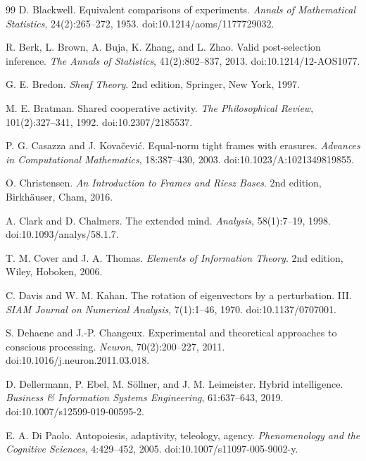 \documentclass[11pt,letterpaper]{article}
\theoremstyle{plain}
\theoremstyle{definition}
\begin{document}
\begin{thebibliography}{99}
D. Blackwell.
\newblock Equivalent comparisons of experiments.
\newblock \emph{Annals of Mathematical Statistics}, 24(2):265--272, 1953.
\newblock doi:10.1214/aoms/1177729032.


R. Berk, L. Brown, A. Buja, K. Zhang, and L. Zhao.
\newblock Valid post-selection inference.
\newblock \emph{The Annals of Statistics}, 41(2):802--837, 2013.
\newblock doi:10.1214/12-AOS1077.

G. E. Bredon.
\newblock \emph{Sheaf Theory}.
\newblock 2nd edition, Springer, New York, 1997.

M. E. Bratman.
\newblock Shared cooperative activity.
\newblock \emph{The Philosophical Review}, 101(2):327--341, 1992.
\newblock doi:10.2307/2185537.

P. G. Casazza and J. Kova\v{c}evi\'c.
\newblock Equal-norm tight frames with erasures.
\newblock \emph{Advances in Computational Mathematics}, 18:387--430, 2003.
\newblock doi:10.1023/A:1021349819855.

O. Christensen.
\newblock \emph{An Introduction to Frames and Riesz Bases}.
\newblock 2nd edition, Birkh\"auser, Cham, 2016.

A. Clark and D. Chalmers.
\newblock The extended mind.
\newblock \emph{Analysis}, 58(1):7--19, 1998.
\newblock doi:10.1093/analys/58.1.7.

T. M. Cover and J. A. Thomas.
\newblock \emph{Elements of Information Theory}.
\newblock 2nd edition, Wiley, Hoboken, 2006.

C. Davis and W. M. Kahan.
\newblock The rotation of eigenvectors by a perturbation. III.
\newblock \emph{SIAM Journal on Numerical Analysis}, 7(1):1--46, 1970.
\newblock doi:10.1137/0707001.

S. Dehaene and J.-P. Changeux.
\newblock Experimental and theoretical approaches to conscious processing.
\newblock \emph{Neuron}, 70(2):200--227, 2011.
\newblock doi:10.1016/j.neuron.2011.03.018.

D. Dellermann, P. Ebel, M. S\"ollner, and J. M. Leimeister.
\newblock Hybrid intelligence.
\newblock \emph{Business \& Information Systems Engineering}, 61:637--643, 2019.
\newblock doi:10.1007/s12599-019-00595-2.

E. A. Di Paolo.
\newblock Autopoiesis, adaptivity, teleology, agency.
\newblock \emph{Phenomenology and the Cognitive Sciences}, 4:429--452, 2005.
\newblock doi:10.1007/s11097-005-9002-y.


\end{thebibliography}
\end{document}
